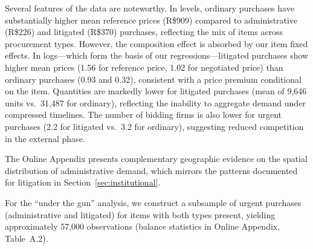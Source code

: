 Several features of the data are noteworthy. In levels, ordinary purchases have substantially higher mean reference prices (R\$909) compared to administrative (R\$226) and litigated (R\$370) purchases, reflecting the mix of items across procurement types. However, the composition effect is absorbed by our item fixed effects. In logs---which form the basis of our regressions---litigated purchases show higher mean prices (1.56 for reference price, 1.02 for negotiated price) than ordinary purchases (0.93 and 0.32), consistent with a price premium conditional on the item. Quantities are markedly lower for litigated purchases (mean of 9,646 units vs.\ 31,487 for ordinary), reflecting the inability to aggregate demand under compressed timelines. The number of bidding firms is also lower for urgent purchases (2.2 for litigated vs.\ 3.2 for ordinary), suggesting reduced competition in the external phase.

The Online Appendix presents complementary geographic evidence on the spatial distribution of administrative demand, which mirrors the patterns documented for litigation in Section~\ref{sec:institutional}.

For the ``under the gun'' analysis, we construct a subsample of urgent purchases (administrative and litigated) for items with both types present, yielding approximately 57,000 observations (balance statistics in Online Appendix, Table~A.2).
